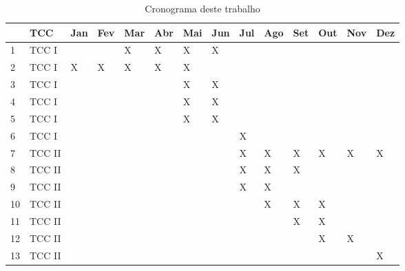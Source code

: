 \begin{table}[h!]\normalsize %
\caption {Cronograma deste trabalho}
\label{tab:implcronograma}
\begin{center}
\def\arraystretch{1}
\setlength{\tabcolsep}{0.15cm}
\begin{tabular}{|l|l|l|l|l|l|l|l|l|l|l|l|l|l|}\hline
 & TCC & Jan & Fev & Mar & Abr & Mai & Jun & Jul & Ago & Set & Out & Nov & Dez \\\hline
1 & TCC I & & & X & X & X & X & & & & & & \\\hline
2 & TCC I & X & X & X & X & X & & & & & & & \\\hline
3 & TCC I & & & & & X & X & & & & & & \\\hline
4 & TCC I & & & & & X & X & & & & & & \\\hline
5 & TCC I & & & & & X & X & & & & & & \\\hline
6 & TCC I & & & & & & & X & & & & & \\\hline
7 & TCC II & & & & & & & X & X & X & X & X & X \\\hline
8 & TCC II & & & & & & & X & X & X & & & \\\hline
9 & TCC II & & & & & & & X & X & & & & \\\hline
10 & TCC II & & & & & & & & X & X & X & & \\\hline
11 & TCC II & & & & & & & & & X & X & & \\\hline
12 & TCC II & & & & & & & & & & X & X & \\\hline
13 & TCC II & & & & & & & & & & & & X \\\hline
\end{tabular}
\end{center}
\end{table}
